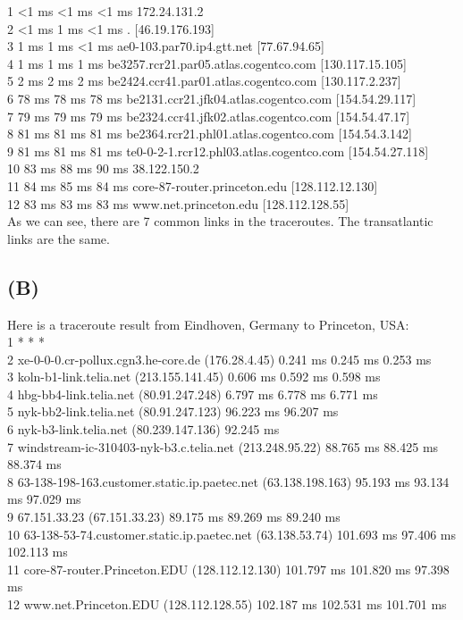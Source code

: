 \documentclass[titlepage, paper=a4, fontsize=11pt]{scrartcl} %
\numberwithin{equation}{section} %
\numberwithin{figure}{section} %
\numberwithin{table}{section} %
\begin{document}
1    <1 ms    <1 ms    <1 ms  172.24.131.2 \\
2    <1 ms     1 ms    <1 ms  . [46.19.176.193] \\
3     1 ms     1 ms    <1 ms  ae0-103.par70.ip4.gtt.net [77.67.94.65] \\
4     1 ms     1 ms     1 ms  be3257.rcr21.par05.atlas.cogentco.com [130.117.15.105] \\
5     2 ms     2 ms     2 ms  be2424.ccr41.par01.atlas.cogentco.com [130.117.2.237] \\
6    78 ms    78 ms    78 ms  be2131.ccr21.jfk04.atlas.cogentco.com [154.54.29.117] \\
7    79 ms    79 ms    79 ms  be2324.ccr41.jfk02.atlas.cogentco.com [154.54.47.17] \\
8    81 ms    81 ms    81 ms  be2364.rcr21.phl01.atlas.cogentco.com [154.54.3.142] \\
9    81 ms    81 ms    81 ms  te0-0-2-1.rcr12.phl03.atlas.cogentco.com [154.54.27.118] \\
10    83 ms    88 ms    90 ms  38.122.150.2 \\
11    84 ms    85 ms    84 ms  core-87-router.princeton.edu [128.112.12.130] \\
12    83 ms    83 ms    83 ms  www.net.princeton.edu [128.112.128.55] 
\\

As we can see, there are 7 common links in the traceroutes. The transatlantic links are the same.

\subsection*{(B)}
Here is a traceroute result from Eindhoven, Germany to Princeton, USA: \\

1  * * * \\
2  xe-0-0-0.cr-pollux.cgn3.he-core.de (176.28.4.45)  0.241 ms  0.245 ms  0.253 ms \\
3  koln-b1-link.telia.net (213.155.141.45)  0.606 ms  0.592 ms  0.598 ms \\
4  hbg-bb4-link.telia.net (80.91.247.248)  6.797 ms  6.778 ms  6.771 ms \\
5  nyk-bb2-link.telia.net (80.91.247.123)  96.223 ms  96.207 ms \\
6  nyk-b3-link.telia.net (80.239.147.136)  92.245 ms \\
7  windstream-ic-310403-nyk-b3.c.telia.net (213.248.95.22)  88.765 ms  88.425 ms  88.374 ms \\
8  63-138-198-163.customer.static.ip.paetec.net (63.138.198.163)  95.193 ms  93.134 ms  97.029 ms \\
9  67.151.33.23 (67.151.33.23)  89.175 ms  89.269 ms  89.240 ms \\
10  63-138-53-74.customer.static.ip.paetec.net (63.138.53.74)  101.693 ms  97.406 ms  102.113 ms \\
11  core-87-router.Princeton.EDU (128.112.12.130)  101.797 ms  101.820 ms  97.398 ms \\
12  www.net.Princeton.EDU (128.112.128.55)  102.187 ms  102.531 ms  101.701 ms
\\
\end{document}
